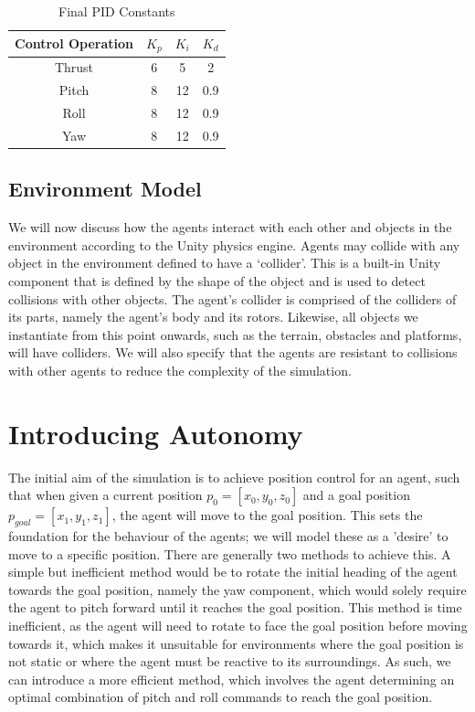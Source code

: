 \documentclass[12pt]{article}
\begin{document}
\begin{table}[ht]
    \centering
        \begin{tabular}{| c | c | c | c |} 
        \hline
        Control Operation & $K_p$ & $K_i$ & $K_d$ \\ 
        \hline
        Thrust & 6 & 5 & 2 \\
        \hline
        Pitch & 8 & 12 & 0.9 \\
        \hline
        Roll & 8 & 12 & 0.9 \\
        \hline
        Yaw & 8 & 12 & 0.9 \\
        \hline
        \end{tabular}
        \caption{Final PID Constants}
        \label{tab:pid-final}
\end{table}

\subsection{Environment Model}
We will now discuss how the agents interact with each other and objects in the environment according to the Unity physics engine. Agents may collide with any object in the environment defined to have a `collider'. This is a built-in Unity component that is defined by the shape of the object and is used to detect collisions with other objects.  The agent's collider is comprised of the colliders of its parts, namely the agent's body and its rotors. Likewise, all objects we instantiate from this point onwards, such as the terrain, obstacles and platforms, will have colliders. We will also specify that the agents are resistant to collisions with other agents to reduce the complexity of the simulation.

\newpage
\section{Introducing Autonomy}
The initial aim of the simulation is to achieve position control for an agent, such that when given a current position $p_0 = [x_0,y_0,z_0]$ and a goal position $p_{goal} = [x_1,y_1,z_1]$, the agent will move to the goal position. This sets the foundation for the behaviour of the agents; we will model these as a 'desire' to move to a specific position. There are generally two methods to achieve this. A simple but inefficient method would be to rotate the initial heading of the agent towards the goal position, namely the yaw component, which would solely require the agent to pitch forward until it reaches the goal position. This method is time inefficient, as the agent will need to rotate to face the goal position before moving towards it, which makes it unsuitable for environments where the goal position is not static or where the agent must be reactive to its surroundings. As such, we can introduce a more efficient method, which involves the agent determining an optimal combination of pitch and roll commands to reach the goal position.
\end{document}

